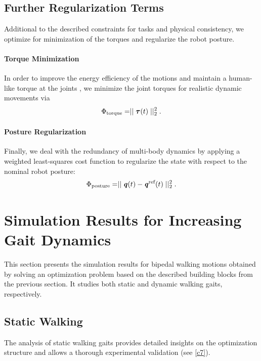 \subsection{Further Regularization Terms}
Additional to the described constraints for tasks and physical consistency, we optimize for minimization of the torques and regularize the robot posture.
\paragraph{Torque Minimization}
In order to improve the energy efficiency of the motions and maintain a human-like torque at the joints \cite{kim1994modeling}, we minimize the joint torques for realistic dynamic movements via
\begin{equation*} 
\Phi_{\text{torque}}=\mid\mid \bm{\mathit{\tau}}(t)\mid\mid^2_2.
\end{equation*}
\paragraph{Posture Regularization}
Finally, we deal with the redundancy of multi-body dynamics by applying a weighted least-squares cost function to regularize the state with respect to the nominal robot posture:
\begin{equation*} 
\Phi_{\text{posture}}=\mid\mid \bm{\mathit{q}}(t)-\bm{\mathit{q}}^\text{ref}(t)\mid\mid^2_2.
\end{equation*}


\section{Simulation Results for Increasing Gait Dynamics}\label{sec:BipedSimulation}
This section presents the simulation results for bipedal walking motions obtained by solving an optimization problem based on the described building blocks from the previous section. It studies both static and dynamic walking gaits, respectively.

\subsection{Static Walking}\label{subsec:StaticWalking}
The analysis of static walking gaits provides detailed insights on the optimization structure and allows a thorough experimental validation (see \cref{c7}).

